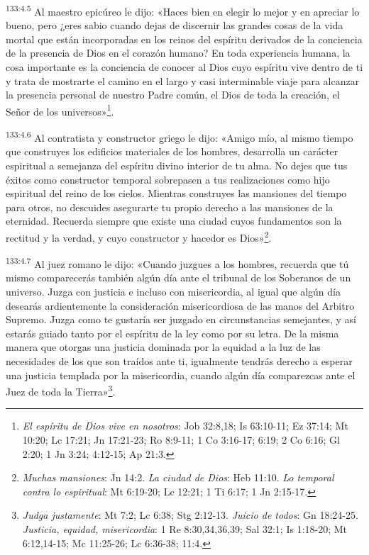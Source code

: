 \par
\textsuperscript{133:4.5} Al maestro epicúreo le dijo: «Haces bien en elegir lo mejor y en apreciar lo bueno, pero ¿eres sabio cuando dejas de discernir las grandes cosas de la vida mortal que están incorporadas en los reinos del espíritu derivados de la conciencia de la presencia de Dios en el corazón humano? En toda experiencia humana, la cosa importante es la conciencia de conocer al Dios cuyo espíritu vive dentro de ti y trata de mostrarte el camino en el largo y casi interminable viaje para alcanzar la presencia personal de nuestro Padre común, el Dios de toda la creación, el Señor de los universos»\footnote{\textit{El espíritu de Dios vive en nosotros}: Job 32:8,18; Is 63:10-11; Ez 37:14; Mt 10:20; Lc 17:21; Jn 17:21-23; Ro 8:9-11; 1 Co 3:16-17; 6:19; 2 Co 6:16; Gl 2:20; 1 Jn 3:24; 4:12-15; Ap 21:3.}.

\par
\textsuperscript{133:4.6} Al contratista y constructor griego le dijo: «Amigo mío, al mismo tiempo que construyes los edificios materiales de los hombres, desarrolla un carácter espiritual a semejanza del espíritu divino interior de tu alma. No dejes que tus éxitos como constructor temporal sobrepasen a tus realizaciones como hijo espiritual del reino de los cielos. Mientras construyes las mansiones del tiempo para otros, no descuides asegurarte tu propio derecho a las mansiones de la eternidad. Recuerda siempre que existe una ciudad cuyos fundamentos son la rectitud y la verdad, y cuyo constructor y hacedor es Dios»\footnote{\textit{Muchas mansiones}: Jn 14:2. \textit{La ciudad de Dios}: Heb 11:10. \textit{Lo temporal contra lo espiritual}: Mt 6:19-20; Lc 12:21; 1 Ti 6:17; 1 Jn 2:15-17.}.

\par
\textsuperscript{133:4.7} Al juez romano le dijo: «Cuando juzgues a los hombres, recuerda que tú mismo comparecerás también algún día ante el tribunal de los Soberanos de un universo. Juzga con justicia e incluso con misericordia, al igual que algún día desearás ardientemente la consideración misericordiosa de las manos del Arbitro Supremo. Juzga como te gustaría ser juzgado en circunstancias semejantes, y así estarás guiado tanto por el espíritu de la ley como por su letra. De la misma manera que otorgas una justicia dominada por la equidad a la luz de las necesidades de los que son traídos ante ti, igualmente tendrás derecho a esperar una justicia templada por la misericordia, cuando algún día comparezcas ante el Juez de toda la Tierra»\footnote{\textit{Judga justamente}: Mt 7:2; Lc 6:38; Stg 2:12-13. \textit{Juicio de todos}: Gn 18:24-25. \textit{Justicia, equidad, misericordia}: 1 Re 8:30,34,36,39; Sal 32:1; Is 1:18-20; Mt 6:12,14-15; Mc 11:25-26; Lc 6:36-38; 11:4.}.

